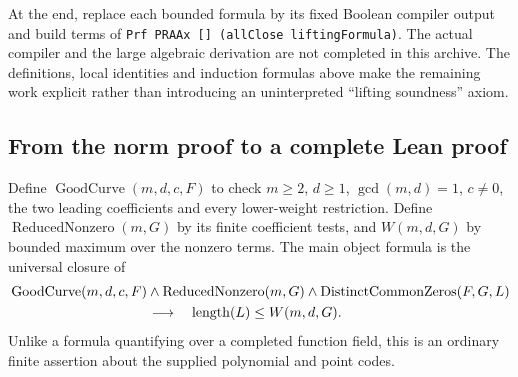 At the end, replace each bounded formula by its fixed Boolean compiler
output and build terms of
\texttt{Prf PRAAx [] (allClose liftingFormula)}. The actual compiler
and the large algebraic derivation are not completed in this archive.
The definitions, local identities and induction formulas above make the
remaining work explicit rather than introducing an uninterpreted
``lifting soundness'' axiom.

\subsection{From the norm proof to a complete Lean proof}

Define \(\operatorname{GoodCurve}(m,d,c,F)\) to check
\(m\ge2\), \(d\ge1\), \(\gcd(m,d)=1\), \(c\ne0\), the two leading
coefficients and every lower-weight restriction. Define
\(\operatorname{ReducedNonzero}(m,G)\) by its finite coefficient tests,
and \(W(m,d,G)\) by bounded maximum over the nonzero terms. The main
object formula is the universal closure of
\[
 \begin{split}
 &\operatorname{GoodCurve}(m,d,c,F)\land
   \operatorname{ReducedNonzero}(m,G)\land
   \operatorname{DistinctCommonZeros}(F,G,L)\\
 &\hspace{35mm}\longrightarrow\quad
   \operatorname{length}(L)\le W(m,d,G).
 \end{split}
\]
Unlike a formula quantifying over a completed function field, this is an
ordinary finite assertion about the supplied polynomial and point codes.

